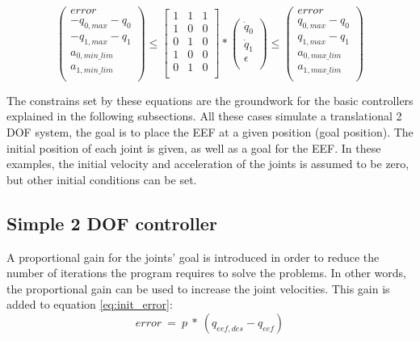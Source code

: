 \begin{equation}
\left( \begin{array}{c}
error \\
-q_{0,max} - q_{0} \\
-q_{1,max} - q_{1} \\
a_{0,min\_lim} \\
a_{1,min\_lim} \\
\end{array}
\right)	\leq 
\left[ \begin{array}{cccc}
1 & 1 & 1 \\
1 & 0 & 0 \\
0 & 1 & 0 \\
1 & 0 & 0 \\
0 & 1 & 0 \\
\end{array}
\right] *
\left( \begin{array}{c}
\dot{q}_{0} \\
\dot{q}_{1} \\
\epsilon \\
\end{array}
\right) 
\leq \left( \begin{array}{c}
error \\
q_{0,max} - q_{0} \\
q_{1,max} - q_{1} \\
a_{0,max\_lim} \\
a_{1,max\_lim} \\
\end{array}
\right)
\label{eq:a_constr}
\end{equation}

The constrains set by these equations are the groundwork for the basic controllers explained in the following subsections. All these cases simulate a translational 2 DOF system, the goal is to place the EEF at a given position (goal position). The initial position of each joint is given, as well as a goal for the EEF. In these examples, the initial velocity and acceleration of the joints is assumed to be zero, but other initial conditions can be set.

\subsection{Simple 2 DOF controller}
A proportional gain for the joints' goal is introduced in order to reduce the number of iterations the program requires to solve the problems. In other words, the proportional gain can be used to increase the joint velocities. This gain is added to equation \ref{eq:init_error}:
\begin{equation}
error\ =\ p\ *\ \left(q_{eef,des} - q_{eef}\right)
\end{equation}



